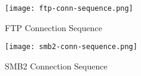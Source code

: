 \begin{figure}[h!]
    \centering
    \texttt{[image: ftp-conn-sequence.png]}
    \caption{FTP Connection Sequence}
    \label{fig:ftp-conn-sequence}
\end{figure}

\begin{figure}[h!]
    \centering
    \texttt{[image: smb2-conn-sequence.png]}
    \caption{SMB2 Connection Sequence}
    \label{fig:smb2-conn-sequence}
\end{figure}
